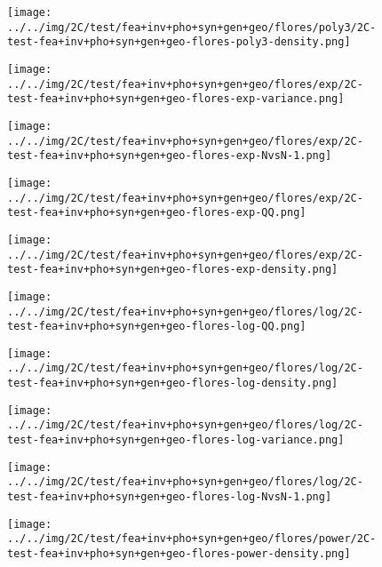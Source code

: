 \begin{figure}[H]
\centering	\texttt{[image: ../../img/2C/test/fea+inv+pho+syn+gen+geo/flores/poly3/2C-test-fea+inv+pho+syn+gen+geo-flores-poly3-density.png]}
\end{figure}
\begin{figure}[H]
\centering	\texttt{[image: ../../img/2C/test/fea+inv+pho+syn+gen+geo/flores/exp/2C-test-fea+inv+pho+syn+gen+geo-flores-exp-variance.png]}
\end{figure}
\begin{figure}[H]
\centering	\texttt{[image: ../../img/2C/test/fea+inv+pho+syn+gen+geo/flores/exp/2C-test-fea+inv+pho+syn+gen+geo-flores-exp-NvsN-1.png]}
\end{figure}
\begin{figure}[H]
\centering	\texttt{[image: ../../img/2C/test/fea+inv+pho+syn+gen+geo/flores/exp/2C-test-fea+inv+pho+syn+gen+geo-flores-exp-QQ.png]}
\end{figure}
\begin{figure}[H]
\centering	\texttt{[image: ../../img/2C/test/fea+inv+pho+syn+gen+geo/flores/exp/2C-test-fea+inv+pho+syn+gen+geo-flores-exp-density.png]}
\end{figure}
\begin{figure}[H]
\centering	\texttt{[image: ../../img/2C/test/fea+inv+pho+syn+gen+geo/flores/log/2C-test-fea+inv+pho+syn+gen+geo-flores-log-QQ.png]}
\end{figure}
\begin{figure}[H]
\centering	\texttt{[image: ../../img/2C/test/fea+inv+pho+syn+gen+geo/flores/log/2C-test-fea+inv+pho+syn+gen+geo-flores-log-density.png]}
\end{figure}
\begin{figure}[H]
\centering	\texttt{[image: ../../img/2C/test/fea+inv+pho+syn+gen+geo/flores/log/2C-test-fea+inv+pho+syn+gen+geo-flores-log-variance.png]}
\end{figure}
\begin{figure}[H]
\centering	\texttt{[image: ../../img/2C/test/fea+inv+pho+syn+gen+geo/flores/log/2C-test-fea+inv+pho+syn+gen+geo-flores-log-NvsN-1.png]}
\end{figure}
\begin{figure}[H]
\centering	\texttt{[image: ../../img/2C/test/fea+inv+pho+syn+gen+geo/flores/power/2C-test-fea+inv+pho+syn+gen+geo-flores-power-density.png]}
\end{figure}
